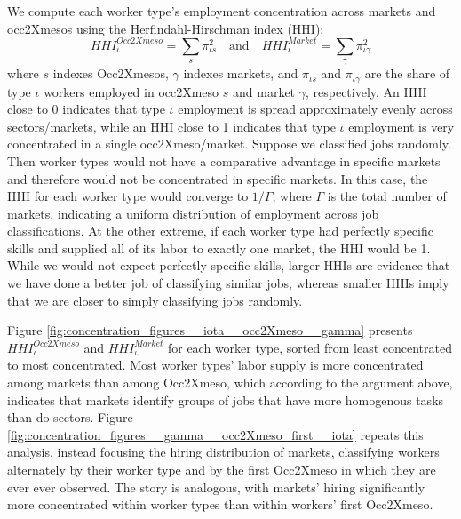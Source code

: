 \documentclass[12pt]{article}
\def\g{\gamma}
\def\i{\iota}
\theoremstyle{definition}
\theoremstyle{plain}
\begin{document}
We compute each worker type's employment concentration across markets and occ2Xmesos using the Herfindahl-Hirschman index (HHI): 
\[ HHI_{\i}^{Occ2Xmeso} = \sum_s \pi_{\i s}^2 \quad \text{and} \quad  HHI_{\i}^{Market} = \sum_\g \pi_{\i \g}^2 \]
where $s$ indexes Occ2Xmesos, $\g$ indexes markets, and $\pi_{\i s}$ and $\pi_{\i \g}$ are the share of type $\i$ workers employed in occ2Xmeso $s$ and market $\g$, respectively. An HHI close to 0 indicates that type $\i$ employment is spread approximately evenly across sectors/markets, while an HHI close to 1 indicates that type $\i$ employment is very concentrated in a single occ2Xmeso/market. Suppose we classified jobs randomly. Then worker types would not have a comparative advantage in specific markets and therefore would not be concentrated in specific markets. In this case, the HHI for each worker type would converge to $1/\Gamma$, where $\Gamma$ is the total number of markets, indicating a uniform distribution of employment across job classifications. At the other extreme, if each worker type had perfectly specific skills and supplied all of its labor to exactly one market, the HHI would be 1. While we would not expect perfectly specific skills,  larger HHIs are evidence that we have done a better job of classifying similar jobs, whereas smaller HHIs imply that we are closer to simply classifying jobs randomly. 


Figure \ref{fig:concentration_figures__iota__occ2Xmeso__gamma} presents $ HHI_{\i}^{Occ2Xmeso}$ and $ HHI_{\i}^{Market}$ for each worker type, sorted from least concentrated to most concentrated. Most worker types' labor supply is more concentrated among markets than among Occ2Xmeso, which according to the argument above, indicates that markets identify groups of jobs that have more homogenous tasks than do sectors. Figure \ref{fig:concentration_figures__gamma__occ2Xmeso_first__iota} repeats this analysis, instead focusing the hiring distribution of markets, classifying workers alternately by their worker type and by the first Occ2Xmeso in which they are ever ever observed. The story is analogous, with markets' hiring significantly more concentrated within worker types than within workers' first Occ2Xmeso. %
\end{document}
